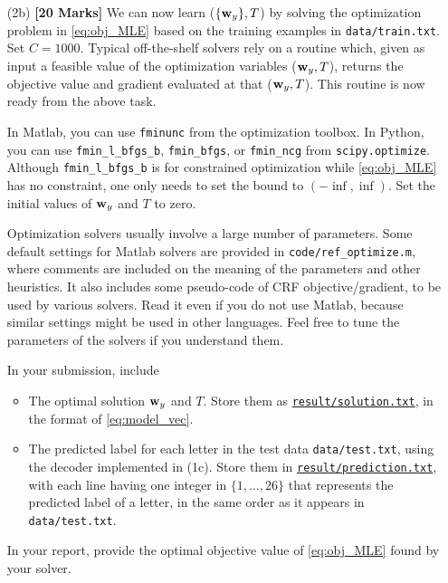 \documentclass[11pt]{report}
\begin{document}
\begin{itemize}
		{\bf Provide} the value of $\frac{1}{n} \sum_{i=1}^n \log p(\yvec^i | X^i)$ for this case in your report.
		
		For your reference,
		in your instructor's Matlab implementation (65 lines),
		it takes 5 seconds to compute the gradient on the whole training set.
		Single core.
		
		
		\item[(2b)] {\bf [20 Marks]} We can now learn ($\{\mathbf{\boldsymbol{w}}_y\}, T$) by solving the optimization problem in \eqref{eq:obj_MLE} based on the training examples in \verb#data/train.txt#.
		Set $C = 1000$.
		Typical off-the-shelf solvers rely on a routine which, given as input a feasible value of the optimization variables ($\mathbf{\boldsymbol{w}}_y, T$), returns the objective value and gradient evaluated at that ($\mathbf{\boldsymbol{w}}_y, T$). This routine is now ready from the above task.
		
		In Matlab, you can use \verb#fminunc# from the optimization toolbox. In Python, you can use \verb#fmin_l_bfgs_b#, \verb#fmin_bfgs#, or \verb#fmin_ncg# from \verb#scipy.optimize#.
		Although \verb#fmin_l_bfgs_b# is for constrained optimization while \eqref{eq:obj_MLE} has no constraint, one only needs to set the bound to $(-\inf, \inf)$.  Set the initial values of $\mathbf{\boldsymbol{w}}_y$ and $T$ to zero.
		
		Optimization solvers usually involve a large number of parameters.
		Some default settings for Matlab solvers are provided in \verb#code/ref_optimize.m#,
		where comments are included on the meaning of the parameters and other heuristics.
		It also includes some pseudo-code of CRF objective/gradient,
		to be used by various solvers.
		Read it even if you do not use Matlab, because similar settings might be used in other languages.
		Feel free to tune the parameters of the solvers if you understand them.
		
		In your submission, include
		\begin{itemize}
			\item The optimal solution $\mathbf{\boldsymbol{w}}_y$ and $T$.  Store them as \underline{\tt{result/solution.txt}}, in the format of \eqref{eq:model_vec}.
			\item The predicted label for each letter in the test data \verb#data/test.txt#, using the decoder implemented in (1c).
			Store them in \underline{\tt{result/prediction.txt}},
			with each line having one integer in $\{1,\ldots, 26\}$ that represents the predicted label of a letter, in the same order as it appears in \verb#data/test.txt#.
		\end{itemize}
		In your report, provide the optimal objective value of \eqref{eq:obj_MLE} found by your solver.
	\end{itemize}
	
\end{document}
